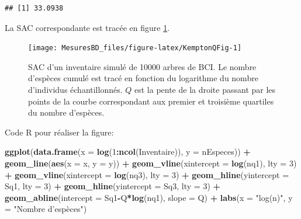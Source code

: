 \documentclass[
  11pt,
  french,
  a4paper,
  extrafontsizes,onecolumn,openright
  ]{memoir}
\newenvironment{Shaded}{\begin{snugshade}}{\end{snugshade}}
\newcommand{\DataTypeTok}[1]{\textcolor[rgb]{0.13,0.29,0.53}{#1}}
\newcommand{\DecValTok}[1]{\textcolor[rgb]{0.00,0.00,0.81}{#1}}
\newcommand{\KeywordTok}[1]{\textcolor[rgb]{0.13,0.29,0.53}{\textbf{#1}}}
\newcommand{\NormalTok}[1]{#1}
\newcommand{\OperatorTok}[1]{\textcolor[rgb]{0.81,0.36,0.00}{\textbf{#1}}}
\newcommand{\StringTok}[1]{\textcolor[rgb]{0.31,0.60,0.02}{#1}}
\begin{document}
\begin{verbatim}
## [1] 33.0938
\end{verbatim}

\normalsize

La SAC correspondante est tracée en figure \ref{fig:KemptonQFig}.



\scriptsize

\begin{figure}

{\centering \texttt{[image: MesuresBD\_files/figure-latex/KemptonQFig-1]} 

}

\caption{SAC d'un inventaire simulé de 10000 arbres de BCI. Le nombre d'espèces cumulé est tracé en fonction du logarithme du nombre d'individus échantillonnés. \(Q\) est la pente de la droite passant par les points de la courbe correspondant aux premier et troisième quartiles du nombre d'espèces.}\label{fig:KemptonQFig}
\end{figure}

\normalsize

Code R pour réaliser la figure:

\scriptsize

\begin{Shaded}
\begin{Highlighting}[]
\KeywordTok{ggplot}\NormalTok{(}\KeywordTok{data.frame}\NormalTok{(}\DataTypeTok{x =} \KeywordTok{log}\NormalTok{(}\DecValTok{1}\OperatorTok{:}\KeywordTok{ncol}\NormalTok{(Inventaire)), }\DataTypeTok{y =}\NormalTok{ nEspeces)) }\OperatorTok{+}
\StringTok{  }\KeywordTok{geom_line}\NormalTok{(}\KeywordTok{aes}\NormalTok{(}\DataTypeTok{x =}\NormalTok{ x, }\DataTypeTok{y =}\NormalTok{ y)) }\OperatorTok{+}
\StringTok{  }\KeywordTok{geom_vline}\NormalTok{(}\DataTypeTok{xintercept =} \KeywordTok{log}\NormalTok{(nq1), }\DataTypeTok{lty =} \DecValTok{3}\NormalTok{) }\OperatorTok{+}
\StringTok{  }\KeywordTok{geom_vline}\NormalTok{(}\DataTypeTok{xintercept =} \KeywordTok{log}\NormalTok{(nq3), }\DataTypeTok{lty =} \DecValTok{3}\NormalTok{) }\OperatorTok{+}
\StringTok{  }\KeywordTok{geom_hline}\NormalTok{(}\DataTypeTok{yintercept =}\NormalTok{ Sq1, }\DataTypeTok{lty =} \DecValTok{3}\NormalTok{) }\OperatorTok{+}
\StringTok{  }\KeywordTok{geom_hline}\NormalTok{(}\DataTypeTok{yintercept =}\NormalTok{ Sq3, }\DataTypeTok{lty =} \DecValTok{3}\NormalTok{) }\OperatorTok{+}
\StringTok{  }\KeywordTok{geom_abline}\NormalTok{(}\DataTypeTok{intercept =}\NormalTok{ Sq1}\OperatorTok{-}\NormalTok{Q}\OperatorTok{*}\KeywordTok{log}\NormalTok{(nq1), }\DataTypeTok{slope =}\NormalTok{ Q) }\OperatorTok{+}
\StringTok{  }\KeywordTok{labs}\NormalTok{(}\DataTypeTok{x =} \StringTok{"log(n)"}\NormalTok{, }\DataTypeTok{y =} \StringTok{"Nombre d'espèces"}\NormalTok{)}
\end{Highlighting}
\end{Shaded}
\end{document}
